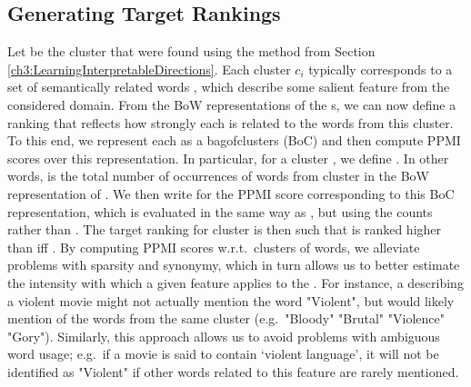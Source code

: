 \subsection{Generating Target Rankings}\label{secTargetRankings} \raggedbottom 
Let  be the cluster  that were found using the method from Section \ref{ch3:LearningInterpretableDirections}. 
Each cluster $c_i$ typically corresponds to a set of semantically related words , which describe some salient feature from the considered domain. 
From the BoW representations of the s, we can now define a ranking that reflects how strongly each  is related to the words from this cluster. To this end, we represent each  as a bag\hmark{-}of\hmark{-}clusters (BoC) and then compute PPMI scores over this representation. In particular, for a cluster , we define . In other words,  is the total number of occurrences of words from cluster  in the BoW representation of . We then write  for the PPMI score corresponding to this BoC representation, which is evaluated in the same way as , but using the counts  rather than . The target ranking for cluster  is then such that  is ranked higher than  iff . By computing PPMI scores w.r.t.\ clusters of words, we alleviate problems with sparsity and synonymy, which in turn allows us to better estimate the intensity with which a given feature applies to the . For instance, a  describing a violent movie might not actually mention the word "Violent", but would likely mention  of the words from the same cluster (e.g.\ "Bloody" "Brutal" "Violence" "Gory"). Similarly, this approach allows us to avoid problems with ambiguous word usage; e.g.\ if a movie is said to contain `violent language', it will not be identified as "Violent" if other words related to this feature are rarely mentioned.

